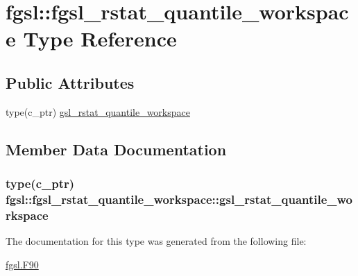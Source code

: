 \hypertarget{structfgsl_1_1fgsl__rstat__quantile__workspace}{}\section{fgsl\+:\+:fgsl\+\_\+rstat\+\_\+quantile\+\_\+workspace Type Reference}
\label{structfgsl_1_1fgsl__rstat__quantile__workspace}
\subsection*{Public Attributes}
\begin{DoxyCompactItemize}
\item 
type(c\+\_\+ptr) \hyperlink{structfgsl_1_1fgsl__rstat__quantile__workspace_a3a10c819060037d313c97aa9603882cc}{gsl\+\_\+rstat\+\_\+quantile\+\_\+workspace}
\end{DoxyCompactItemize}


\subsection{Member Data Documentation}
\hypertarget{structfgsl_1_1fgsl__rstat__quantile__workspace_a3a10c819060037d313c97aa9603882cc}{}
\subsubsection[{gsl\+\_\+rstat\+\_\+quantile\+\_\+workspace}]{\setlength{\rightskip}{0pt plus 5cm}type(c\+\_\+ptr) fgsl\+::fgsl\+\_\+rstat\+\_\+quantile\+\_\+workspace\+::gsl\+\_\+rstat\+\_\+quantile\+\_\+workspace}\label{structfgsl_1_1fgsl__rstat__quantile__workspace_a3a10c819060037d313c97aa9603882cc}


The documentation for this type was generated from the following file\+:\begin{DoxyCompactItemize}
\item 
\hyperlink{fgsl_8F90}{fgsl.\+F90}\end{DoxyCompactItemize}
